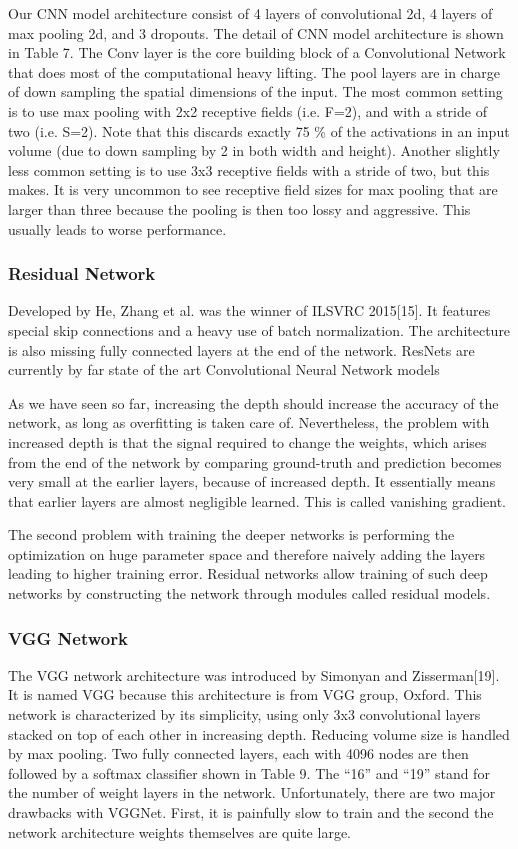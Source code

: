\documentclass[10pt,twocolumn]{article}
\begin{document}
\par 
Our CNN model architecture consist of 4 layers of convolutional 2d, 4 layers of max pooling 2d, and 3 dropouts. The detail of CNN model architecture is shown in Table 7. The Conv layer is the core building block of a Convolutional Network that does most of the computational heavy lifting. The pool layers are in charge of down sampling the spatial dimensions of the input. The most common setting is to use max pooling with 2x2 receptive fields (i.e. F=2), and with a stride of two (i.e. S=2). Note that this discards exactly 75 \% of the activations in an input volume (due to down sampling by 2 in both width and height). Another slightly less common setting is to use 3x3 receptive fields with a stride of two, but this makes. It is very uncommon to see receptive field sizes for max pooling that are larger than three because the pooling is then too lossy and aggressive. This usually leads to worse performance.
\subsubsection{Residual Network}
Developed by He, Zhang et al. was the winner of ILSVRC 2015[15]. It features special skip connections and a heavy use of batch normalization. The architecture is also missing fully connected layers at the end of the network. ResNets are currently by far state of the art Convolutional Neural Network models
\par
As we have seen so far, increasing the depth should increase the accuracy of the network, as long as overfitting is taken care of. Nevertheless, the problem with increased depth is that the signal required to change the weights, which arises from the end of the network by comparing ground-truth and prediction becomes very small at the earlier layers, because of increased depth. It essentially means that earlier layers are almost negligible learned. This is called vanishing gradient.
\par 
The second problem with training the deeper networks is performing the optimization on huge parameter space and therefore naively adding the layers leading to higher training error. Residual networks allow training of such deep networks by constructing the network through modules called residual models.
\subsubsection{VGG Network}
The VGG network architecture was introduced by Simonyan and Zisserman[19]. It is named VGG because this architecture is from VGG group, Oxford. This network is characterized by its simplicity, using only 3x3 convolutional layers stacked on top of each other in increasing depth. Reducing volume size is handled by max pooling. Two fully connected layers, each with 4096 nodes are then followed by a softmax classifier shown in Table 9. The “16” and “19” stand for the number of weight layers in the network. Unfortunately, there are two major drawbacks with VGGNet. First, it is painfully slow to train and the second the network architecture weights themselves are quite large.
\end{document}
